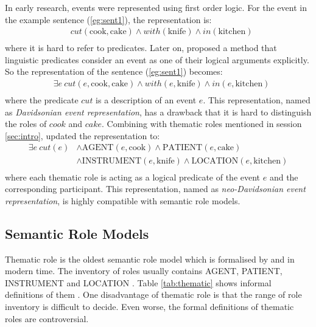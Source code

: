 \documentclass[a4paper]{article}
\begin{document}
In early research, events were represented using first order logic. For the event in the example sentence (\ref{eg:sent1}), the representation is:
\begin{equation*} \label{eg:fol}
\begin{aligned}
    & cut(\text{cook}, \text{cake}) \land with(\text{knife}) \land in(\text{kitchen}) \\
\end{aligned}
\end{equation*}
where it is hard to refer to predicates. Later on, \citet{davidson1967logical} proposed a method that linguistic predicates consider an event as one of their logical arguments explicitly. So the representation of the sentence (\ref{eg:sent1}) becomes: 
\begin{equation*} \label{eg:davidsonian}
\begin{aligned}
    & \exists e\ cut(e, \text{cook}, \text{cake}) \land with(e, \text{knife}) \land in(e, \text{kitchen}) \\
\end{aligned}
\end{equation*}
where the predicate $cut$ is a description of an event $e$. This representation, named as \textit{Davidsonian event representation}, has a drawback that it is hard to distinguish the roles of $cook$ and $cake$. Combining with thematic roles mentioned in session \ref{sec:intro}, \citet{parsons1990events} updated the representation to: 
\begin{equation*} \label{eg:neodavidsonian}
\begin{aligned}
    \exists e\ cut(e)
    & \land \text{AGENT}(e, \text{cook}) \land \text{PATIENT}(e, \text{cake}) \\
    & \land \text{INSTRUMENT}(e, \text{knife}) \land \text{LOCATION}(e, \text{kitchen}) \\
\end{aligned}
\end{equation*}
where each thematic role is acting as a logical predicate of the event $e$ and the corresponding participant. This representation, named as \textit{neo-Davidsonian event representation}, is highly compatible with semantic role models. 


\subsection{Semantic Role Models} \label{sec:semanticrole}
Thematic role is the oldest semantic role model which is formalised by \citet{gruber1965studies} and \citet{fillmore1968case} in modern time. The inventory of roles usually contains AGENT, PATIENT, INSTRUMENT and LOCATION \citep{aarts2013english}. Table \ref{tab:thematic} shows informal definitions of them \citep{jurafsky2014speech}. One disadvantage of thematic role is that the range of role inventory is difficult to decide. Even worse, the formal definitions of thematic roles are controversial. 
\end{document}
